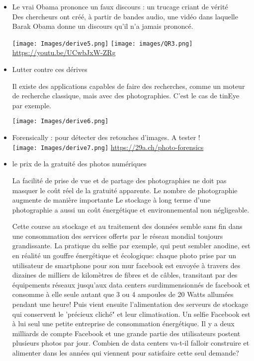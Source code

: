 \documentclass[10pt,fleqn]{article} %
\begin{document}
\begin{itemize}
\begin{multicols}{2}
\end{multicols}
\item Le vrai Obama prononce un faux discours : un trucage criant de vérité
	\\Des chercheurs ont créé, à partir de bandes audio, une vidéo dans laquelle Barak Obama donne un discours qu'il n'a jamais prononcé.
	
	\texttt{[image: Images/derive5.png]}
\texttt{[image: images/QR3.png]}
	\href{https://youtu.be/UCwbJxW-ZRg}{https://youtu.be/UCwbJxW-ZRg}	

\item Lutter contre ces dérives	

Il existe des applications capables de faire des recherches, comme un moteur de recherche classique, mais avec des photographies. C'est le cas de tinEye par exemple.

	\texttt{[image: Images/derive6.png]}

\item 	Forensically : pour détecter des retouches d'images. A tester !
\\
	\texttt{[image: Images/derive7.png]}
		\href{https://29a.ch/photo-forensics/#forensic-magnifier}{https://29a.ch/photo-forensics}	
	
\item le prix de la gratuité des photos numériques

La facilité de prise de vue et de partage des photographies ne doit pas masquer le coût  réel de la gratuité apparente. Le nombre de photographie augmente de manière importante 
Le stockage à long terme d'une photographie a aussi un coût énergétique et environnemental non négligeable. 

Cette course au stockage et au traitement des données semble sans fin dans une consommation des services offerts par le réseau mondial toujours grandissante. La pratique du selfie par exemple, qui peut sembler anodine, est en réalité un gouffre énergétique et écologique: chaque photo prise par un utilisateur de smartphone pour son mur facebook est envoyée à travers des dizaines de milliers de kilomètres de fibres et de câbles, transitant par des équipements réseaux jusqu'aux data centers surdimmensionnés de facebook et consomme à elle seule autant que 3 ou 4 ampoules de 20 Watts allumées pendant une heure! Puis vient ensuite l'alimentation des serveurs de stockage qui conservent le 'précieux cliché" et leur climatisation. Un selfie Facebook est à lui seul une petite entreprise de consommation énergétique. Il y a deux milliards de compte Facebook et une grande partie des utilisateurs postent plusieurs photos par jour. Combien de data centers va-t-il falloir construire et alimenter dans les années qui viennent pour satisfaire cette seul demande?

\end{itemize}
\end{document}

